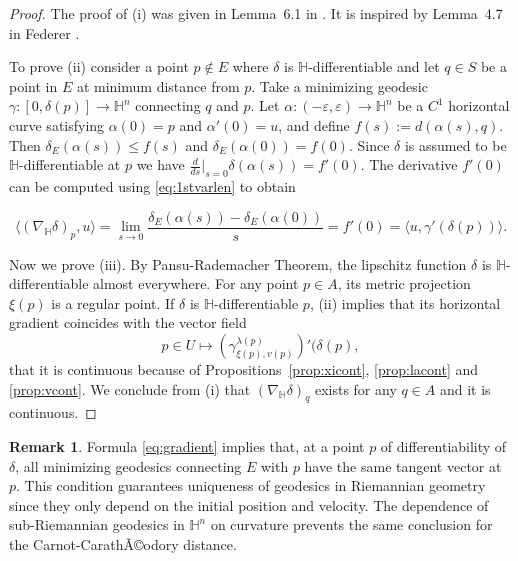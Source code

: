 \documentclass[10pt]{amsart}
\theoremstyle{definition}
\newtheorem{remark}[theorem]{Remark}
\theoremstyle{remark}
\numberwithin{equation}{section}
\begin{document}
\begin{proof}
The proof of (i) was given in Lemma~6.1 in \cite{MR2299576}. It is inspired by Lemma~4.7 in Federer \cite{MR0110078}.

To prove (ii) consider a point $p\not\in E$ where $\delta$ is ${{\mathbb{H}}}$-differentiable and let $q\in S$ be a point in $E$ at minimum distance from $p$. Take a minimizing  geodesic ${\gamma}:[0,\delta(p)]\to{{\mathbb{H}}}^n$ connecting $q$ and $p$. Let $\alpha:(-{\varepsilon},{\varepsilon})\to{{\mathbb{H}}}^n$ be a $C^1$ horizontal curve satisfying $\alpha(0)=p$ and $\alpha'(0)=u$, and define $f(s):=d(\alpha(s),q)$. Then $\delta_E(\alpha(s)){\leqslant} f(s)$ and $\delta_E(\alpha(0))=f(0)$. Since $\delta$ is assumed to be ${{\mathbb{H}}}$-differentiable at $p$ we have $\frac{d}{ds}|_{s=0}\delta(\alpha(s))=f'(0)$. The derivative $f'(0)$ can be computed using \eqref{eq:1stvarlen} to obtain

\begin{equation}
\label{eq:gradient}
{\langle{(\nabla_{{\mathbb{H}}}\delta)_p,u}\rangle}=\lim_{s\to 0}\frac{\delta_E(\alpha(s))-\delta_E(\alpha(0))}{s}= f'(0)={\langle{u,{\gamma}'(\delta(p))}\rangle}.
\end{equation}

Now we prove (iii). By Pansu-Rademacher Theorem, the lipschitz function $\delta$ is ${{\mathbb{H}}}$-differentiable almost everywhere. For any point $p\in A$, its metric projection $\xi(p)$ is a regular point. If  $\delta$ is ${{\mathbb{H}}}$-differentiable $p$, (ii) implies that its horizontal gradient coincides with the vector field
\[
p\in U\mapsto (\gamma_{\xi(p),v(p)}^{{\lambda}(p)})'(\delta(p),
\]
that it is continuous because of Propositions~\ref{prop:xicont}, \ref{prop:lacont} and \ref{prop:vcont}. We conclude from (i) that $(\nabla_{{\mathbb{H}}}\delta)_q$ exists for any $q\in A$ and it is continuous.
\end{proof}

\begin{remark}
Formula \eqref{eq:gradient} implies that, at a point $p$ of differentiability of $\delta$, all minimizing geodesics connecting $E$ with $p$ have the same tangent vector at $p$. This condition guarantees uniqueness of geodesics in Riemannian geometry since they only depend on the initial position and velocity. The dependence of sub-Riemannian geodesics in ${{\mathbb{H}}}^n$ on curvature prevents the same conclusion for the Carnot-CarathÃ©odory distance.
\end{remark}
\end{document}

